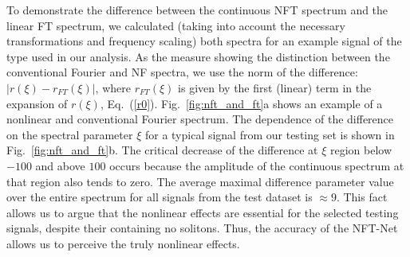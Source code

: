 To demonstrate the difference between the continuous NFT spectrum and the linear FT spectrum, we calculated (taking into account the necessary transformations and frequency scaling) both spectra for an example signal of the type used in our analysis.
As the measure showing the distinction between the conventional Fourier and NF spectra, we use the norm of the difference: $|r(\xi) - r_{FT}(\xi)|$, where $r_{FT}(\xi)$ is given by the first (linear) term in the expansion of $r(\xi)$, Eq.~(\ref{r0}).
Fig.~\ref{fig:nft_and_ft}a shows an example of a nonlinear and conventional Fourier spectrum.
The dependence of the difference on the spectral parameter $\xi$ for a typical signal from our testing set is shown in Fig.~\ref{fig:nft_and_ft}b.
The critical decrease of the difference at $\xi$ region below $-100$ and above $100$ occurs because the amplitude of the continuous spectrum at that region also tends to zero. The average maximal difference parameter value over the entire spectrum for all signals from the test dataset is $\approx 9$. 
This fact allows us to argue that the nonlinear effects are essential for the selected testing signals, despite their containing no solitons.
Thus, the accuracy of the NFT-Net allows us to perceive the truly nonlinear effects. 

